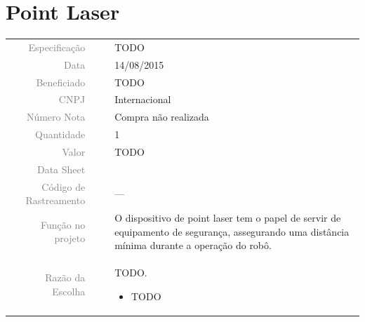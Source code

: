 \documentclass{article}
\begin{document}
\section*{Point Laser}
\begin{table}[ht!]

	\begin{tabular}{r l l p{12cm} }
		
		\textcolor{gray}{Especificação} &&& 	{TODO}\\
		\textcolor{gray}{Data} &&& 				{14/08/2015}\\
        \textcolor{gray}{Beneficiado} &&&		{TODO} \\
        \textcolor{gray}{CNPJ} &&& 				{Internacional} \\
        \textcolor{gray}{Número Nota} &&& 		{Compra não realizada} \\
		\textcolor{gray}{Quantidade} &&& 		{1} \\
		\textcolor{gray}{Valor} &&& 			{TODO} \\
		\textcolor{gray}{Data Sheet} &&& 		{} \\
		\textcolor{gray}{Código de Rastreamento} &&& {---} \\

		\textcolor{gray}{Função no projeto} &&& {O dispositivo de point laser tem o
		papel de servir de equipamento de segurança, assegurando uma distância mínima
		durante a operação do robô.}
		\\
		\textcolor{gray}{Razão da Escolha} &&& {TODO.
		 \begin{itemize}
		  \item TODO
		\end{itemize}}

	\end{tabular}
\end{table}
\end{document}
